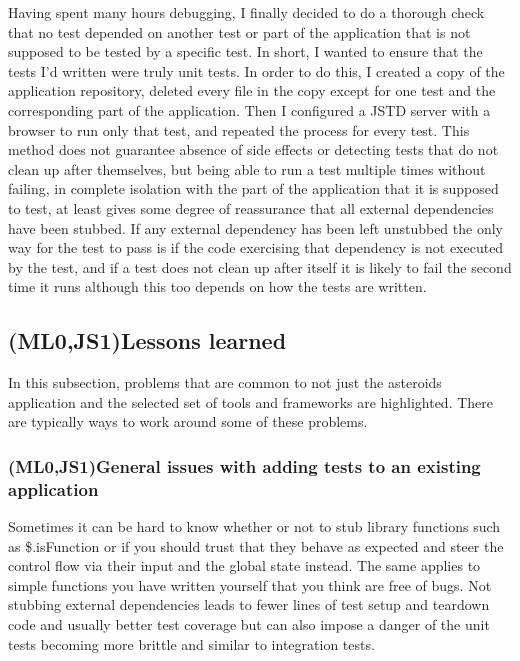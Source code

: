 \documentclass[11pt]{article}
\begin{document}
Having spent many hours debugging, I finally decided to do a thorough check that no test depended on another test or part of the application that is not supposed to be tested by a specific test. In short, I wanted to ensure that the tests I'd written were truly unit tests. In order to do this, I created a copy of the application repository, deleted every file in the copy except for one test and the corresponding part of the application. Then I configured a JSTD server with a browser to run only that test, and repeated the process for every test. This method does not guarantee absence of side effects or detecting tests that do not clean up after themselves, but being able to run a test multiple times without failing, in complete isolation with the part of the application that it is supposed to test, at least gives some degree of reassurance that all external dependencies have been stubbed. If any external dependency has been left unstubbed the only way for the test to pass is if the code exercising that dependency is not executed by the test, and if a test does not clean up after itself it is likely to fail the second time it runs although this too depends on how the tests are written.

\subsection{(ML0,JS1)Lessons learned}

In this subsection, problems that are common to not just the asteroids application and the selected set of tools and frameworks are highlighted. There are typically ways to work around some of these problems.

\subsubsection{(ML0,JS1)General issues with adding tests to an existing application}

Sometimes it can be hard to know whether or not to stub library functions such as \$.isFunction or if you should trust that they behave as expected and steer the control flow via their input and the global state instead. The same applies to simple functions you have written yourself that you think are free of bugs. Not stubbing external dependencies leads to fewer lines of test setup and teardown code and usually better test coverage but can also impose a danger of the unit tests becoming more brittle and similar to integration tests.
\end{document}
